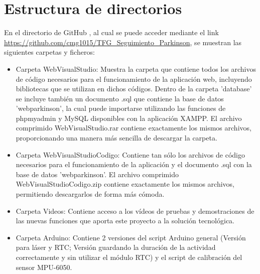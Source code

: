 
\section{Estructura de directorios}
En el directorio de GitHub \cite{MarcosGordillo2024}, al cual se puede acceder mediante el link \url{https://github.com/cmg1015/TFG_Seguimiento_Parkinson}, se muestran las siguientes carpetas y ficheros:
\begin{itemize}
    \item Carpeta WebVisualStudio: Muestra la carpeta que contiene todos los archivos de código necesarios para el funcionamiento de la aplicación web, incluyendo bibliotecas que se utilizan en dichos códigos. Dentro de la carpeta 'database' se incluye también un documento .sql que contiene la base de datos 'webparkinson', la cual puede importarse utilizando las funciones de phpmyadmin y MySQL disponibles con la aplicación XAMPP. El archivo comprimido WebVisualStudio.rar contiene exactamente los mismos archivos, proporcionando una manera más sencilla de descargar la carpeta.
    \item Carpeta WebVisualStudioCodigo: Contiene tan sólo los archivos de código necesarios para el funcionamiento de la aplicación y el documento .sql con la base de datos 'webparkinson'. El archivo comprimido WebVisualStudioCodigo.zip contiene exactamente los mismos archivos, permitiendo descargarlos de forma más cómoda.
    \item Carpeta Videos: Contiene acceso a los vídeos de pruebas y demostraciones de las nuevas funciones que aporta este proyecto a la solución tecnológica.
    \item Carpeta Arduino: Contiene 2 versiones del script Arduino general (Versión para láser y RTC; Versión guardando la duración de la actividad correctamente y sin utilizar el módulo RTC) y el script de calibración del sensor MPU-6050.
\end{itemize}

